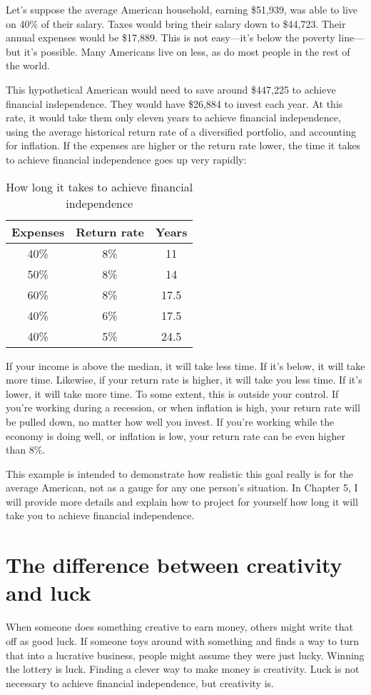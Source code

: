 Let's suppose the average American household, earning \$51,939, was able to live on 40\% of their salary. Taxes would bring their salary down to \$44,723. Their annual expenses would be \$17,889. This is not easy---it's below the poverty line---but it's possible. Many Americans live on less, as do most people in the rest of the world.

This hypothetical American would need to save around \$447,225 to achieve financial independence. They would have \$26,884 to invest each year. At this rate, it would take them only eleven years to achieve financial independence, using the average historical return rate of a diversified portfolio, and accounting for inflation. If the expenses are higher or the return rate lower, the time it takes to achieve financial independence goes up very rapidly:

\begin{table}[ht]
\caption{How long it takes to achieve financial independence}
\centering
\begin{tabular}{c c c}
\hline\hline
Expenses & Return rate & Years \\
\hline
40\% & 8\% & 11 \\
50\% & 8\% & 14 \\
60\% & 8\% & 17.5 \\
40\% & 6\% & 17.5 \\
40\% & 5\% & 24.5 \\
\hline
\end{tabular}
\end{table}

If your income is above the median, it will take less time. If it's below, it will take more time. Likewise, if your return rate is higher, it will take you less time. If it's lower, it will take more time. To some extent, this is outside your control. If you're working during a recession, or when inflation is high, your return rate will be pulled down, no matter how well you invest. If you're working while the economy is doing well, or inflation is low, your return rate can be even higher than 8\%.

This example is intended to demonstrate how realistic this goal really is for the average American, not as a gauge for any one person's situation. In Chapter 5, I will provide more details and explain how to project for yourself how long it will take you to achieve financial independence.

\section{The difference between creativity and luck}
When someone does something creative to earn money, others might write that off as good luck. If someone toys around with something and finds a way to turn that into a lucrative business, people might assume they were just lucky. Winning the lottery is luck. Finding a clever way to make money is creativity. Luck is not necessary to achieve financial independence, but creativity is.

